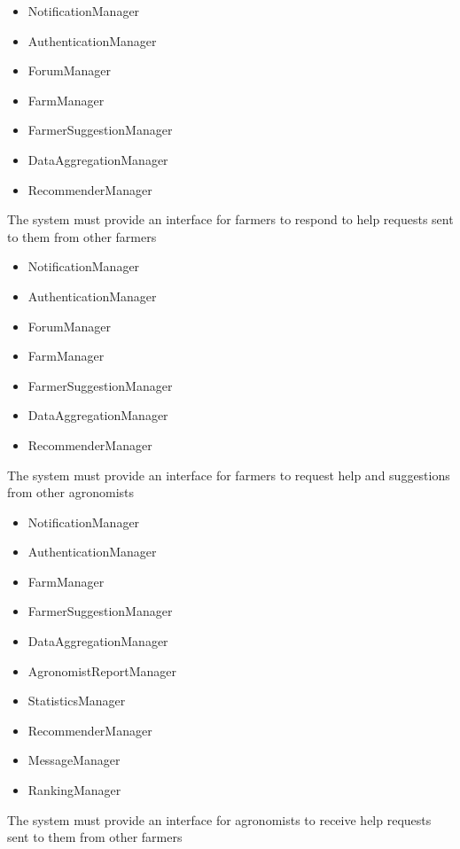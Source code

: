 \begin{itemize}
\begin{itemize}
\item NotificationManager
\item AuthenticationManager
\item ForumManager
\item FarmManager
\item FarmerSuggestionManager
\item DataAggregationManager
\item RecommenderManager


\end{itemize}

 The system must provide an interface for farmers to respond to help requests sent to them from other farmers

\begin{itemize}

\item NotificationManager
\item AuthenticationManager
\item ForumManager
\item FarmManager
\item FarmerSuggestionManager
\item DataAggregationManager
\item RecommenderManager

\end{itemize}

 The system must provide an interface for farmers to request help and suggestions from other agronomists
\begin{itemize}

\item NotificationManager
\item AuthenticationManager
\item FarmManager
\item FarmerSuggestionManager
\item DataAggregationManager
\item AgronomistReportManager
\item StatisticsManager
\item RecommenderManager
\item MessageManager
\item RankingManager

\end{itemize}

 The system must provide an interface for agronomists to receive help requests sent to them from other farmers
\begin{itemize}


\end{itemize}
\end{itemize}
